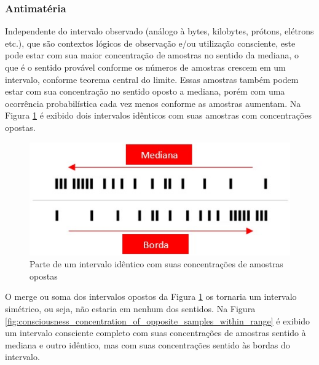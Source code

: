 \subsubsection{Antimatéria}
Independente do intervalo observado (análogo à bytes, kilobytes, prótons, elétrons etc.), que são contextos lógicos de observação e/ou utilização consciente, este pode estar com sua maior concentração de amostras no sentido da mediana, o que é o sentido provável conforme os números de amostras crescem em um intervalo, conforme teorema central do limite. Essas amostras também podem estar com sua concentração no sentido oposto a mediana, porém com uma ocorrência probabilística cada vez menos conforme as amostras aumentam. Na Figura \ref{fig:consciousness_concentration_of_opposite_samples} é exibido dois intervalos idênticos com suas amostras com concentrações opostas.

\begin{figure}[H]
\caption{Parte de um intervalo idêntico com suas concentrações de amostras opostas}
\label{fig:consciousness_concentration_of_opposite_samples}
\centering
\includegraphics[scale=.8]{sections/images/consciousness_concentration_of_opposite_samples.jpg}
\end{figure}

O merge ou soma dos intervalos opostos da Figura \ref{fig:consciousness_concentration_of_opposite_samples} os tornaria um intervalo simétrico, ou seja, não estaria em nenhum dos sentidos.
Na Figura \ref{fig:consciousness_concentration_of_opposite_samples_within_range} é exibido um intervalo consciente completo com suas concentrações de amostras sentido à mediana e outro idêntico, mas com suas concentrações sentido às bordas do intervalo.

